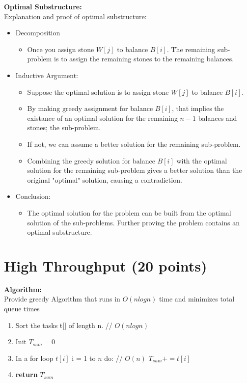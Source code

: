 \documentclass{article}[12pt]
\begin{document}
\pagebreak
\noindent\textbf{Optimal Substructure:} \\
Explanation and proof of optimal substructure: \\
\begin{itemize}
  \item Decomposition
    \begin{itemize}
      \item Once you assign stone $W[j]$ to balance $B[i]$.
        The remaining sub-problem is to assign the remaining stones to the remaining balances.
    \end{itemize}
  \item Inductive Argument:
    \begin{itemize}
      \item Suppose the optimal solution is to assign stone $W[j]$ to balance $B[i]$.
      \item By making greedy assignment for balance $B[i]$, that implies
        the existance of an optimal solution for the remaining $n-1$ balances and stones; the sub-problem.
      \item If not, we can assume a better solution for the remaining sub-problem.
      \item Combining the greedy solution for balance $B[i]$ with the optimal solution for the remaining sub-problem
        gives a better solution than the original "optimal" solution, causing a contradiction.
    \end{itemize}
  \item Conclusion:
    \begin{itemize}
      \item The optimal solution for the problem can be built from the optimal solution of the sub-problems.
        Further proving the problem contains an optimal substructure.
    \end{itemize}
\end{itemize}

\newpage
\section{High Throughput (20 points)}
\noindent\textbf{Algorithm:} \\
   Provide greedy Algorithm that runs in $O(nlogn)$ time and minimizes total queue times
    \begin{enumerate}
      \item Sort the tasks t[] of length n.  // $O(nlogn)$
      \item Init $T_{sum} = 0$
      \item In a for loop $t[i]$ i = 1 to $n$ do: // $O(n)$
        $T_{sum} += t[i]$ \\
      \item \textbf{return} $T_{sum}$
    \end{enumerate}
\end{document}
